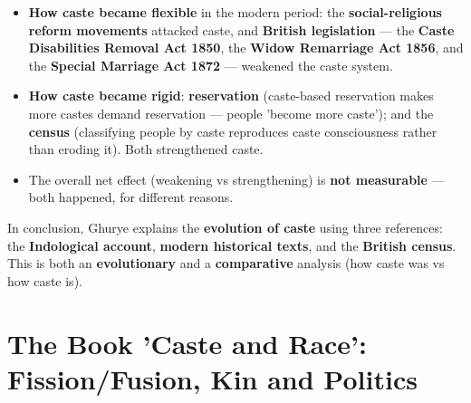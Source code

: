 \begin{KeyConcept}
\begin{itemize}
\item \textbf{How caste became flexible} in the modern period: the \textbf{social-religious reform movements} attacked caste, and \textbf{British legislation} --- the \textbf{Caste Disabilities Removal Act 1850}, the \textbf{Widow Remarriage Act 1856}, and the \textbf{Special Marriage Act 1872} --- weakened the caste system.
\item \textbf{How caste became rigid}: \textbf{reservation} (caste-based reservation makes more castes demand reservation --- people 'become more caste'); and the \textbf{census} (classifying people by caste reproduces caste consciousness rather than eroding it). Both strengthened caste.
\item The overall net effect (weakening vs strengthening) is \textbf{not measurable} --- both happened, for different reasons.
\end{itemize}
\end{KeyConcept}

\begin{KeyConcept}
In conclusion, Ghurye explains the \textbf{evolution of caste} using three references: the \textbf{Indological account}, \textbf{modern historical texts}, and the \textbf{British census}. This is both an \textbf{evolutionary} and a \textbf{comparative} analysis (how caste was vs how caste is).
\end{KeyConcept}

\section{The Book 'Caste and Race': Fission/Fusion, Kin and Politics}

